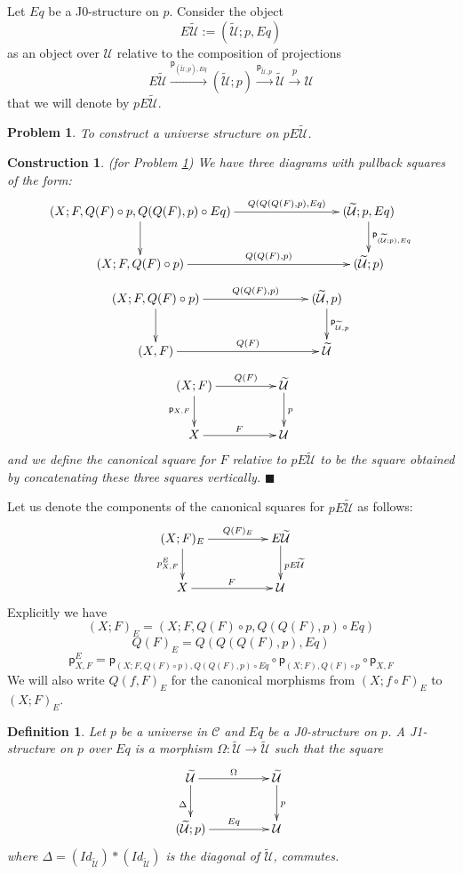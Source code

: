 \documentclass[12pt]{article}
\numberwithin{equation}{section}
\newenvironment{eq}{\begin{equation}}{\end{equation}}
\newtheorem{definition}[proposition]{Definition}
\newtheorem{problem}[proposition]{Problem}
\newtheorem{construction0}[proposition]{Construction}
\newenvironment{construction}[1]{\begin{construction0}(for Problem \ref{#1})}{$\blacksquare$ \end{construction0}}
\newcommand{\llabel}[1]{\label{#1}}
\newcommand{\sr}{\rightarrow}
\newcommand{\lr}{\longrightarrow}
\newcommand{\wt}{\widetilde}
\newcommand{\p}{\mathsf{p}}
\newcommand{\U}{\mathcal{U}}
\begin{document}
Let $Eq$ be a J0-structure on $p$. Consider the object
%
$$E\wt{\U}:=(\wt{\U};p,Eq)$$
%
as an object over $\U$ relative to the composition of projections
%
$$E\wt{\U}\stackrel{\p_{(\wt{\U};p),Eq}}{\lr}(\wt{\U};p)\stackrel{\p_{\wt{\U},p}}{\lr}
\wt{\U}\stackrel{p}{\sr} \U$$
%
that we will denote by $pE\wt{\U}$.
%
\begin{problem}
\llabel{2015.05.08.prob1} To construct a universe structure on $pE\wt{\U}$.
\end{problem}
%
\begin{construction}{2015.05.08.prob1}\rm
\llabel{2015.05.08.constr1} We have three diagrams with pullback squares of the
form:
%
$$
\begin{xy}
          \xymatrix@C=7pc{ (X;F,Q(F)\circ p, Q(Q(F),p)\circ Eq)
            \ar[r]^-{Q(Q(Q(F),p),Eq)} \ar[d] & (\wt{\U}; p, Eq)
            \ar[d]^{\p_{(\wt{\U};p),Eq}}\\ (X;F,Q(F)\circ p) \ar[r]^-{Q(Q(F),p)}
            & (\wt{\U};p) }
\end{xy}
$$
$$
\begin{xy}
          \xymatrix@C=7pc{ (X;F,Q(F)\circ p) \ar[r]^-{Q(Q(F),p)} \ar[d] &
            (\wt{\U},p) \ar[d]^{\p_{\wt{\U},p}}\\ (X,F) \ar[r]^-{Q(F)} & \wt{\U} }
\end{xy}
$$
$$
\begin{xy}
          \xymatrix@C=4pc{ (X;F) \ar[r]^-{Q(F)} \ar[d]_{\p_{X,F}} & \wt{\U}
            \ar[d]^{p}\\ X \ar[r]^{F} & \U }
\end{xy}
$$
%
and we define the canonical square for $F$ relative to $pE\wt{\U}$ to be the
square obtained by concatenating these three squares vertically.
\end{construction}
%
Let us denote the components of the canonical squares for $pE\wt{\U}$ as
follows:
%
$$
\begin{xy}
          \xymatrix@C=4pc{ (X;F)_{E} \ar[r]^-{Q(F)_{E}} \ar[d]_{p^E_{X,F}} &
            E\wt{\U} \ar[d]^{pE\wt{\U}}\\ X \ar[r]^{F} & \U }
\end{xy}
$$
%
Explicitly we have
%
$$(X;F)_{E}=(X;F,Q(F)\circ p, Q(Q(F),p)\circ Eq)$$
$$Q(F)_{E}=Q(Q(Q(F),p),Eq)$$
$$\p_{X,F}^E=\p_{(X;F,Q(F)\circ p),Q(Q(F),p)\circ Eq}\circ \p_{(X;F),Q(F)\circ
  p}\circ \p_{X,F}$$
%
We will also write $Q(f,F)_{E}$ for the canonical morphisms from $(X;f\circ
F)_{E}$ to $(X;F)_{E}$.
%
\begin{definition}
\llabel{2015.03.27.def5} Let $p$ be a universe in $\mathcal C$ and $Eq$ be a
J0-structure on $p$. A J1-structure on $p$ over $Eq$ is a morphism
$\Omega:\wt{\U}\sr \wt{\U}$ such that the square
%
\begin{eq}\llabel{2015.03.27.sq1}
\begin{xy}
          \xymatrix@C=4pc{ \wt{\U} \ar[r]^-{\Omega} \ar[d]_{\Delta} & \wt{\U}
            \ar[d]^{p}\\ (\wt{\U};p) \ar[r]^{Eq} & \U }
\end{xy}
\end{eq}
%
where $\Delta=(Id_{\wt{\U}})*(Id_{\wt{\U}})$ is the diagonal of $\wt{\U}$,
commutes.
\end{definition}
%
\end{document}
